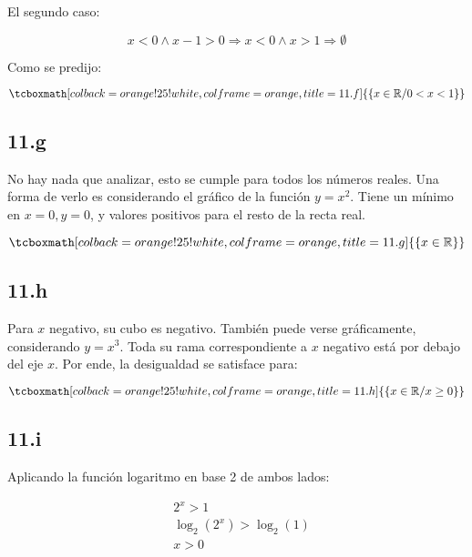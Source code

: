 \documentclass{article}
\newcommand{\hresult}[2]{\tcboxmath[colback=orange!25!white,colframe=orange, title=#1] {#2} }
\begin{document}
El segundo caso:

\begin{equation}
x < 0 \wedge x - 1 > 0 \Rightarrow x < 0 \wedge x > 1 \Rightarrow \emptyset
\end{equation}

Como se predijo:

\begin{equation}
\hresult{11.f}{ \{ x \in \mathbb{R} / 0 < x < 1 \} }
\end{equation}

\subsection*{11.g}
\label{subsec:11.g}

No hay nada que analizar, esto se cumple para todos los números reales. Una forma de verlo es considerando el gráfico de la función $y = x^2$. Tiene un mínimo en $x = 0, y = 0$, y valores positivos para el resto de la recta real.

\begin{equation}
\hresult{11.g}{ \{ x \in \mathbb{R} \} }
\end{equation}

\subsection*{11.h}
\label{subsec:11.h}

Para $x$ negativo, su cubo es negativo. También puede verse gráficamente, considerando $y = x^3$. Toda su rama correspondiente a $x$ negativo está por debajo del eje $x$. Por ende, la desigualdad se satisface para:

\begin{equation}
\hresult{11.h}{ \{ x \in \mathbb{R} / x \geq 0 \} }
\end{equation}

\subsection*{11.i}
\label{subsec:11.i}

Aplicando la función logaritmo en base 2 de ambos lados:

\begin{subequations}
\begin{align}
& 2^x > 1 \\
& \log_2(2^x) > \log_2(1) \\
& x > 0
\end{align}
\end{subequations}
\end{document}
